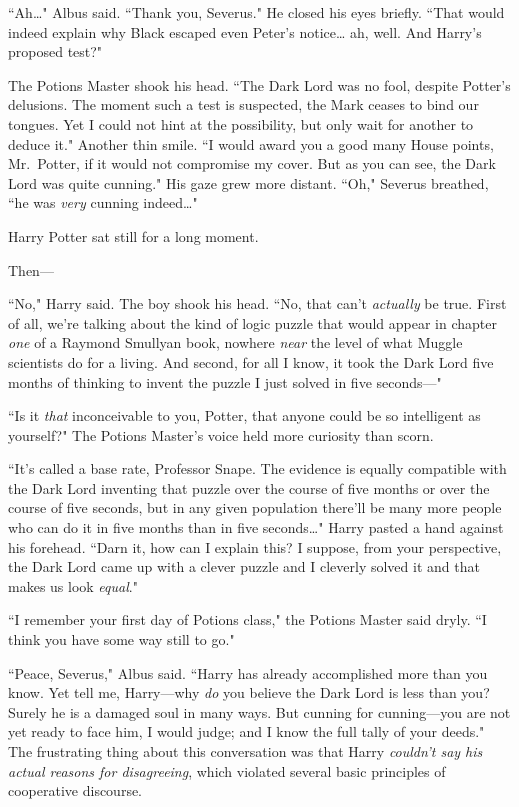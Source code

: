 ``Ah{\ldots}" Albus said. ``Thank you, Severus." He closed his eyes briefly. ``That would indeed explain why Black escaped even Peter's notice{\ldots} ah, well. And Harry's proposed test?"

The Potions Master shook his head. ``The Dark Lord was no fool, despite Potter's delusions. The moment such a test is suspected, the Mark ceases to bind our tongues. Yet I could not hint at the possibility, but only wait for another to deduce it." Another thin smile. ``I would award you a good many House points, Mr.~Potter, if it would not compromise my cover. But as you can see, the Dark Lord was quite cunning." His gaze grew more distant. ``Oh," Severus breathed, ``he was \emph{very} cunning indeed{\ldots}"

Harry Potter sat still for a long moment.

Then—

``No," Harry said. The boy shook his head. ``No, that can't \emph{actually} be true. First of all, we're talking about the kind of logic puzzle that would appear in chapter \emph{one} of a Raymond Smullyan book, nowhere \emph{near} the level of what Muggle scientists do for a living. And second, for all I know, it took the Dark Lord five months of thinking to invent the puzzle I just solved in five seconds—"

``Is it \emph{that} inconceivable to you, Potter, that anyone could be so intelligent as yourself?" The Potions Master's voice held more curiosity than scorn.

``It's called a base rate, Professor Snape. The evidence is equally compatible with the Dark Lord inventing that puzzle over the course of five months or over the course of five seconds, but in any given population there'll be many more people who can do it in five months than in five seconds{\ldots}" Harry pasted a hand against his forehead. ``Darn it, how can I explain this? I suppose, from your perspective, the Dark Lord came up with a clever puzzle and I cleverly solved it and that makes us look \emph{equal}."

``I remember your first day of Potions class," the Potions Master said dryly. ``I think you have some way still to go."

``Peace, Severus," Albus said. ``Harry has already accomplished more than you know. Yet tell me, Harry—why \emph{do} you believe the Dark Lord is less than you? Surely he is a damaged soul in many ways. But cunning for cunning—you are not yet ready to face him, I would judge; and I know the full tally of your deeds." \later The frustrating thing about this conversation was that Harry \emph{couldn't say his actual reasons for disagreeing}, which violated several basic principles of cooperative discourse.

